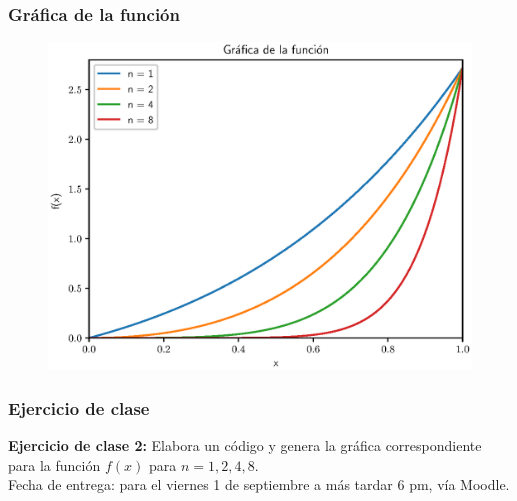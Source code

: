 \documentclass[12pt]{beamer}
\begin{document}
\begin{frame}
\frametitle{Gráfica de la función}
\begin{figure}
	\centering
	\includegraphics[scale=0.6]{Imagenes/Estabilidad_02.eps}
\end{figure}
\end{frame}
\begin{frame}
\frametitle{Ejercicio de clase}
\textbf{Ejercicio de clase 2:} Elabora un código y genera la gráfica correspondiente para la función $f(x)$ para $n = 1, 2, 4, 8$.
\\
\bigskip
\pause
Fecha de entrega: para el viernes 1 de septiembre a más tardar 6 pm, vía Moodle.
\end{frame}




\end{document}
